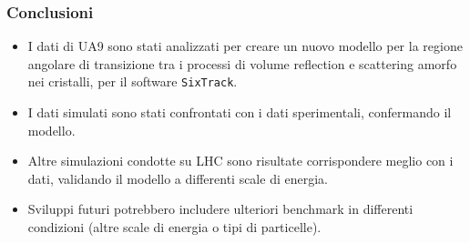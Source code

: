 \documentclass[10pt]{beamer}
\begin{document}
\begin{frame}
\frametitle{Conclusioni}

\begin{itemize}
\item I dati di UA9 sono stati analizzati per creare un nuovo modello per la regione angolare di transizione
tra i processi di volume reflection e scattering amorfo nei cristalli, per il software \texttt{SixTrack}.
\item I dati simulati sono stati confrontati con i dati sperimentali, confermando il modello.
\item Altre simulazioni condotte su LHC sono risultate corrispondere meglio con i dati, validando il modello a differenti scale di energia.
\item Sviluppi futuri potrebbero includere ulteriori benchmark in differenti condizioni (altre scale di energia o tipi di particelle).
\end{itemize}

\end{frame}



% 
\end{document}
